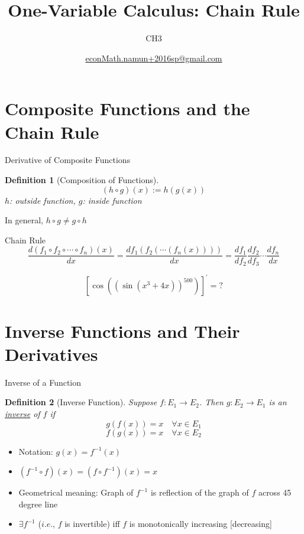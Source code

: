 \documentclass[a4paper,11pt]{article}
\author[조남운]{\url{econMath.namun+2016sp@gmail.com}}
\title{One-Variable Calculus: Chain Rule}
\subtitle{CH3}
\newtheorem{defn}{Definition}
\begin{document}
	\maketitle


\section{Composite Functions and the Chain Rule} %
\label{sec:composite_functions_and_the_chain_rule}

\begin{frame}[t]{Derivative of Composite Functions}
	\begin{defn}
		[Composition of Functions]
		\[
			( h\circ g )(x) := h(g(x))
		\]
		$h$: outside function, $g$: inside function
	\end{defn}
	In general, $h\circ g \neq g \circ h$
	\begin{block}
		{Chain Rule}
		\[
			\frac{d(f_1 \circ f_2 \circ \cdots \circ f_n)(x)}{dx}=\frac{df_1(f_2(\cdots(f_n(x))))}{dx}= \frac{df_1}{df_2}\frac{df_2}{df_3}\cdots\frac{df_n}{dx}
		\]
	\end{block}
	\[
		[\cos((\sin(x^3+4x))^{500})]^\prime =?
	\]
\end{frame}



\section{Inverse Functions and Their Derivatives} %
\label{sec:inverse_functions_and_their_derivatives}

\begin{frame}[t]{Inverse of a Function}
	\begin{defn}
		[Inverse Function]
		Suppose $f:E_1 \rightarrow E_2$. Then $g:E_2\rightarrow E_1$ is an \uline{inverse} of $f$ if\[
			g(f(x))=x\quad \forall x\in E_1
		\]\[
						f(g(x))=x\quad \forall x\in E_2
		\]
	\end{defn}
	\begin{itemize}
		\item Notation: $g(x)=f^{-1}(x)$
		\item $(f^{-1}\circ f) (x) = (f\circ f^{-1}) (x)=x$
		\item Geometrical meaning: Graph of $f^{-1}$ is reflection of the graph of $f$ across 45 degree line
		\item $\exists f^{-1}$ ($i.e.$, $f$ is invertible) iff $f$ is monotonically increasing [decreasing]
	\end{itemize}
\end{frame}
\end{document}
